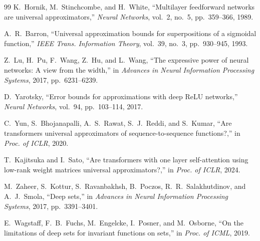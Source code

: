 \documentclass[conference]{IEEEtran}
\begin{document}
\begin{thebibliography}{99}
 K.~Hornik, M.~Stinchcombe, and H.~White, ``Multilayer feedforward networks are universal approximators,'' \emph{Neural Networks}, vol.~2, no.~5, pp.~359--366, 1989.

 A.~R.~Barron, ``Universal approximation bounds for superpositions of a sigmoidal function,'' \emph{IEEE Trans. Information Theory}, vol.~39, no.~3, pp.~930--945, 1993.

 Z.~Lu, H.~Pu, F.~Wang, Z.~Hu, and L.~Wang, ``The expressive power of neural networks: A view from the width,'' in \emph{Advances in Neural Information Processing Systems}, 2017, pp.~6231--6239.

 D.~Yarotsky, ``Error bounds for approximations with deep ReLU networks,'' \emph{Neural Networks}, vol.~94, pp.~103--114, 2017.

 C.~Yun, S.~Bhojanapalli, A.~S.~Rawat, S.~J.~Reddi, and S.~Kumar, ``Are transformers universal approximators of sequence-to-sequence functions?,'' in \emph{Proc. of ICLR}, 2020.

 T.~Kajitsuka and I.~Sato, ``Are transformers with one layer self-attention using low-rank weight matrices universal approximators?,'' in \emph{Proc. of ICLR}, 2024.

 M.~Zaheer, S.~Kottur, S.~Ravanbakhsh, B.~Poczos, R.~R.~Salakhutdinov, and A.~J.~Smola, ``Deep sets,'' in \emph{Advances in Neural Information Processing Systems}, 2017, pp.~3391--3401.

 E.~Wagstaff, F.~B.~Fuchs, M.~Engelcke, I.~Posner, and M.~Osborne, ``On the limitations of deep sets for invariant functions on sets,'' in \emph{Proc. of ICML}, 2019.

\end{thebibliography}
\end{document}
